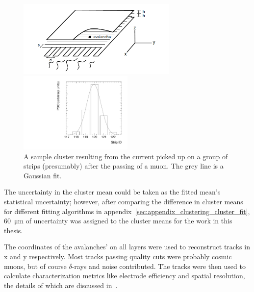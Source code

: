 \begin{figure}
    \centering
    \includegraphics[width = 0.7\textwidth]{figures/mwpc_lefebvre_thesis_gatti.png}
    \caption{A sketch of an sTGC-like detector. The position of the avalanche could be extracted from the wires and strips that picked up the avalanche signal. The signals on individual strips are sketched. Clustering was the processs of fitting a Gaussian to the peak value of the individual contiguous strips, as is done in figure~\ref{fig:sample_cluster}. In this work, the x(y)-coordinate will always refer to the coordinate perpendicular to the wires (strips)~\cite{lefebvre_thesis, gatti_optimum_1979}.}
    \label{fig:mwpc_coords}
    \vspace*{\floatsep}
    \centering
    \includegraphics[width = 0.5\textwidth]{figures/sample_cluster_QL2C04_event5_layer2.pdf}
    \caption{A sample cluster resulting from the current picked up on a group of strips (presumably) after the passing of a muon. The grey line is a Gaussian fit.}
    \label{fig:sample_cluster}
\end{figure}

The uncertainty in the cluster mean could be taken as the fitted mean's statistical uncertainty; however, after comparing the difference in cluster means for different fitting algorithms in appendix~\ref{sec:appendix_clustering_cluster_fit}, \SI{60}{\micro\meter} of uncertainty was assigned to the cluster means for the work in this thesis.

The coordinates of the avalanches' on all layers were used to reconstruct tracks in x and y respectively. Most tracks passing quality cuts were probably cosmic muons, but of course $\delta$-rays and noise contributed. The tracks were then used to calculate characterization metrics like electrode efficiency and spatial resolution, the details of which are discussed in~\cite{lefebvre_thesis}.

